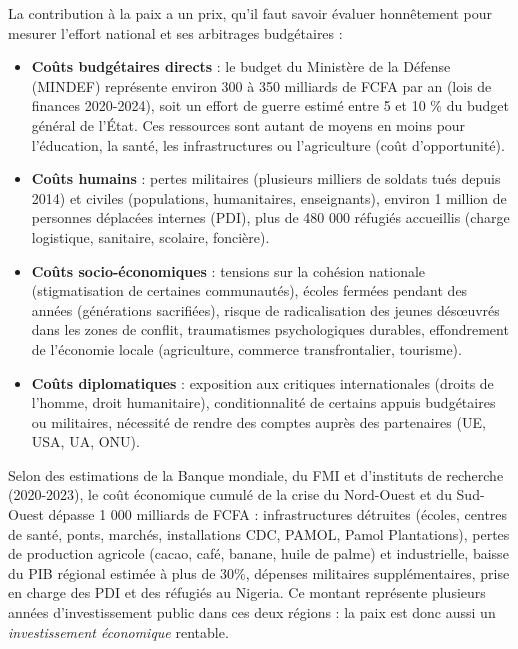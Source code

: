 \documentclass[11pt]{article}
\begin{document}
La contribution à la paix a un prix, qu'il faut savoir évaluer honnêtement pour mesurer l'effort national et ses arbitrages budgétaires :

\begin{itemize}
\item \textbf{Coûts budgétaires directs} : le budget du Ministère de la Défense (MINDEF) représente environ 300 à 350 milliards de FCFA par an (lois de finances 2020-2024), soit un effort de guerre estimé entre 5 et 10 \% du budget général de l'État. Ces ressources sont autant de moyens en moins pour l'éducation, la santé, les infrastructures ou l'agriculture (coût d'opportunité).
\item \textbf{Coûts humains} : pertes militaires (plusieurs milliers de soldats tués depuis 2014) et civiles (populations, humanitaires, enseignants), environ 1 million de personnes déplacées internes (PDI), plus de 480 000 réfugiés accueillis (charge logistique, sanitaire, scolaire, foncière).
\item \textbf{Coûts socio-économiques} : tensions sur la cohésion nationale (stigmatisation de certaines communautés), écoles fermées pendant des années (générations sacrifiées), risque de radicalisation des jeunes désœuvrés dans les zones de conflit, traumatismes psychologiques durables, effondrement de l'économie locale (agriculture, commerce transfrontalier, tourisme).
\item \textbf{Coûts diplomatiques} : exposition aux critiques internationales (droits de l'homme, droit humanitaire), conditionnalité de certains appuis budgétaires ou militaires, nécessité de rendre des comptes auprès des partenaires (UE, USA, UA, ONU).
\end{itemize}

\begin{exemplebox}
Selon des estimations de la Banque mondiale, du FMI et d'instituts de recherche (2020-2023), le coût économique cumulé de la crise du Nord-Ouest et du Sud-Ouest dépasse 1 000 milliards de FCFA : infrastructures détruites (écoles, centres de santé, ponts, marchés, installations CDC, PAMOL, Pamol Plantations), pertes de production agricole (cacao, café, banane, huile de palme) et industrielle, baisse du PIB régional estimée à plus de 30\%, dépenses militaires supplémentaires, prise en charge des PDI et des réfugiés au Nigeria. Ce montant représente plusieurs années d'investissement public dans ces deux régions : la paix est donc aussi un \emph{investissement économique} rentable.
\end{exemplebox}
\end{document}

